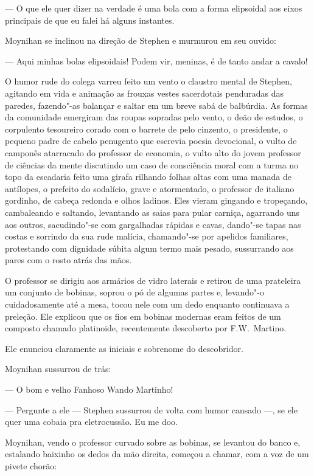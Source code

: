  --- O que ele quer dizer na verdade é uma bola com a forma elipsoidal aos
eixos principais de que eu falei há alguns instantes.

Moynihan se inclinou na direção de Stephen e murmurou em seu ouvido:

 --- Aqui minhas bolas elipsoidais! Podem vir, meninas, é de tanto andar a
cavalo!

O humor rude do colega varreu feito um vento o claustro mental de
Stephen, agitando em vida e animação as frouxas vestes sacerdotais
penduradas das paredes, fazendo"-as balançar e saltar em um breve sabá
de balbúrdia. As formas da comunidade emergiram das roupas sopradas
pelo vento, o deão de estudos, o corpulento tesoureiro corado com o
barrete de pelo cinzento, o presidente, o pequeno padre de cabelo
penugento que escrevia poesia devocional, o vulto de camponês
atarracado do professor de economia, o vulto alto do jovem professor de
ciências da mente discutindo um caso de consciência moral com a turma
no topo da escadaria feito uma girafa rilhando folhas altas com uma
manada de antílopes, o prefeito do sodalício, grave e atormentado, o
professor de italiano gordinho, de cabeça redonda e olhos ladinos. Eles
vieram gingando e tropeçando, cambaleando e saltando, levantando as
saias para pular carniça, agarrando uns aos outros, sacudindo"-se com gargalhadas rápidas e cavas, dando"-se tapas nas costas e sorrindo da
sua rude malícia, chamando"-se por apelidos familiares, protestando com
dignidade súbita algum termo mais pesado, sussurrando aos pares com o
rosto atrás das mãos.

O professor se dirigiu aos armários de vidro laterais e retirou de uma
prateleira um conjunto de bobinas, soprou o pó de algumas partes e,
levando"-o cuidadosamente até a mesa, tocou nele com um dedo enquanto
continuava a preleção. Ele explicou que os fios em bobinas modernas
eram feitos de um composto chamado platinoide, recentemente descoberto
por F.W.~Martino.

Ele enunciou claramente as iniciais e sobrenome do descobridor.

Moynihan sussurrou de trás:

 --- O bom e velho Fanhoso Wando Martinho!

 --- Pergunte a ele --- Stephen sussurrou de volta com humor cansado ---, se ele quer uma cobaia pra eletrocussão. Eu me doo.

Moynihan, vendo o professor curvado sobre as bobinas, se levantou do
banco e, estalando baixinho os dedos da mão direita, começou a chamar,
com a voz de um pivete chorão:

